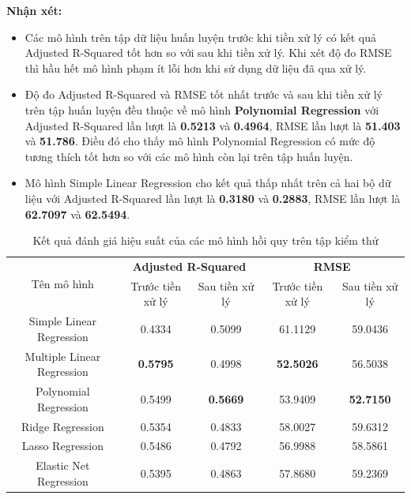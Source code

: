 \documentclass[runningheads]{llncs}
\begin{document}
\textbf{Nhận xét:} 
\begin{itemize}
	\item Các mô hình trên tập dữ liệu huấn luyện trước khi tiền xử lý có kết quả Adjusted R-Squared tốt hơn so với sau khi tiền xử lý. Khi xét độ đo RMSE thì hầu hết mô hình phạm ít lỗi hơn khi sử dụng dữ liệu đã qua xử lý.
	\item Độ đo Adjusted R-Squared và RMSE tốt nhất trước và sau khi tiền xử lý trên tập huấn luyện đều thuộc về mô hình \textbf{Polynomial Regression} với Adjusted R-Squared lần lượt là \textbf{0.5213} và \textbf{0.4964}, RMSE lần lượt là \textbf{51.403} và \textbf{51.786}. Điều đó cho thấy mô hình Polynomial Regression có mức độ tương thích tốt hơn so với các mô hình còn lại trên tập huấn luyện.
	\item Mô hình Simple Linear Regression cho kết quả thấp nhất trên cả hai bộ dữ liệu với Adjusted R-Squared lần lượt là \textbf{0.3180} và \textbf{0.2883}, RMSE lần lượt là \textbf{62.7097} và \textbf{62.5494}.
\end{itemize}

\begin{table}[H]
	\scriptsize
	\setlength{\tabcolsep}{0.5em}
	\renewcommand{\arraystretch}{1.5}
	\begin{center}
		\caption{Kết quả đánh giá hiệu suất của các mô hình hồi quy trên tập kiểm thử}\label{tab3}
		\begin{tabular}{|c|c|c|c|c|}
			\hline
			\multirow{2}{*}{Tên mô hình} & \multicolumn{2}{c|}{\textbf{Adjusted R-Squared}} & \multicolumn{2}{c|}{\textbf{RMSE}}\\ \cline{2-5}
										 & \multicolumn{1}{c|}{Trước tiền xử lý} & \multicolumn{1}{c|}{Sau tiền xử lý}
										 & \multicolumn{1}{c|}{Trước tiền xử lý} & \multicolumn{1}{c|}{Sau tiền xử lý}\\
			\hline
			Simple Linear Regression&0.4334&0.5099&61.1129&59.0436\\
			
			\hline
			Multiple Linear Regression&\textbf{0.5795}&0.4998&\textbf{52.5026}&56.5038\\
			
			\hline
			Polynomial Regression&0.5499&\textbf{0.5669}&53.9409&\textbf{52.7150}\\
			
			\hline
			Ridge Regression&0.5354&0.4833&58.0027&59.6312\\
			
			
			\hline
			Lasso Regression&0.5486&0.4792&56.9988&58.5861\\
			
			\hline
			Elastic Net Regression&0.5395&0.4863&57.8680&59.2369\\
			\hline
		\end{tabular}			
	\end{center}
\end{table}
\end{document}
